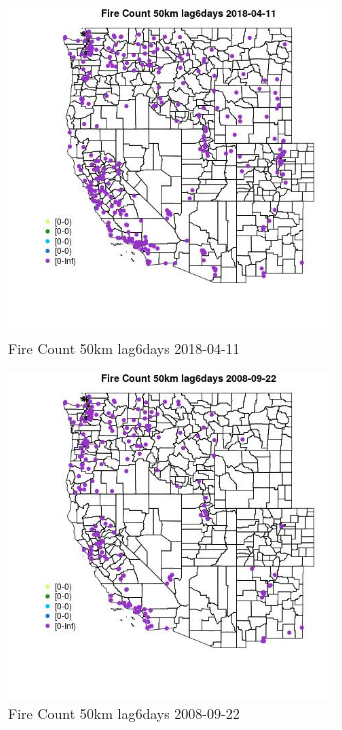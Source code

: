 \begin{figure} 
\centering  
\includegraphics[width=0.77\textwidth]{Code_Outputs/Report_ML_input_PM25_Step4_part_e_de_duplicated_aves_compiled_2019-05-18wNAs_MapObsFire_Count_50km_lag6days2018-04-11.jpg} 
\caption{\label{fig:Report_ML_input_PM25_Step4_part_e_de_duplicated_aves_compiled_2019-05-18wNAsMapObsFire_Count_50km_lag6days2018-04-11}Fire Count 50km lag6days 2018-04-11} 
\end{figure} 
 

\begin{figure} 
\centering  
\includegraphics[width=0.77\textwidth]{Code_Outputs/Report_ML_input_PM25_Step4_part_e_de_duplicated_aves_compiled_2019-05-18wNAs_MapObsFire_Count_50km_lag6days2008-09-22.jpg} 
\caption{\label{fig:Report_ML_input_PM25_Step4_part_e_de_duplicated_aves_compiled_2019-05-18wNAsMapObsFire_Count_50km_lag6days2008-09-22}Fire Count 50km lag6days 2008-09-22} 
\end{figure} 
 

